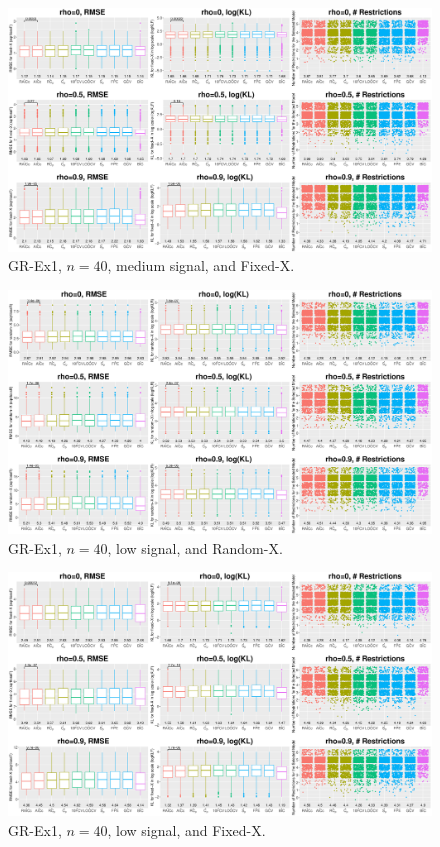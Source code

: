 \begin{figure}[!ht]
\centering
\includegraphics[width=\textwidth]{figures/supplement/fixedx_GR-Ex1_n40_msnr.eps}
\caption{GR-Ex1, $n=40$, medium signal, and Fixed-X.}
\end{figure}
\clearpage
\begin{figure}[!ht]
\centering
\includegraphics[width=\textwidth]{figures/supplement/randomx_GR-Ex1_n40_lsnr.eps}
\caption{GR-Ex1, $n=40$, low signal, and Random-X.}
\end{figure}
\begin{figure}[!ht]
\centering
\includegraphics[width=\textwidth]{figures/supplement/fixedx_GR-Ex1_n40_lsnr.eps}
\caption{GR-Ex1, $n=40$, low signal, and Fixed-X.}
\end{figure}
